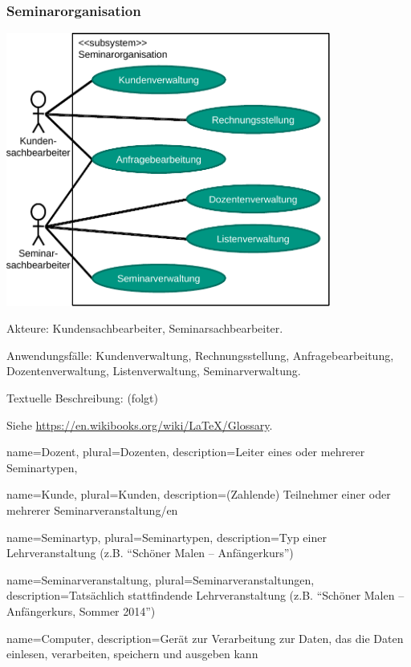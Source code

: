 \documentclass[parskip=full]{scrartcl}
\begin{document}
\subsubsection{Seminarorganisation}
\begin{center}
\includegraphics[width=0.8\textwidth]{szenario_seminarorganisation.pdf}
\end{center}

Akteure: Kundensachbearbeiter, Seminarsachbearbeiter.

Anwendungsfälle: Kundenverwaltung, Rechnungsstellung, Anfragebearbeitung, Dozentenverwaltung, Listenverwaltung, Seminarverwaltung.

Textuelle Beschreibung: (folgt)



%
%
\printglossaries
Siehe \url{https://en.wikibooks.org/wiki/LaTeX/Glossary}.

%
%
{
  name=Dozent,
  plural=Dozenten,
  description={Leiter eines oder mehrerer Seminartypen},
}

{
  name=Kunde,
  plural=Kunden,
  description={(Zahlende) Teilnehmer einer oder mehrerer Seminarveranstaltung/en}
}

{
  name=Seminartyp,
  plural=Seminartypen,
  description={Typ einer Lehrveranstaltung (z.B. \enquote{Schöner Malen -- Anfängerkurs})}
}

{
  name=Seminarveranstaltung,
  plural=Seminarveranstaltungen,
  description={Tatsächlich stattfindende Lehrveranstaltung (z.B. \enquote{Schöner Malen -- Anfängerkurs, Sommer 2014})}
}

{
  name=Computer,
  description={Gerät zur Verarbeitung zur Daten, das die Daten einlesen, verarbeiten, speichern und ausgeben kann}
}
\end{document}
